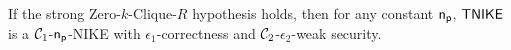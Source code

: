 
\begin{theorem}
\label{thm:time-nike}
	If the strong Zero-$k$-Clique-$R$ hypothesis holds, then  for any constant $\mathsf{n_p}$, $\mathsf{TNIKE}$ is a $\mathcal{C}_1$-$\mathsf{n_p}$-NIKE with $\epsilon_{1}$-correctness and $\mathcal{C}_2$-$\epsilon_{2}$-weak security. %
\end{theorem}





